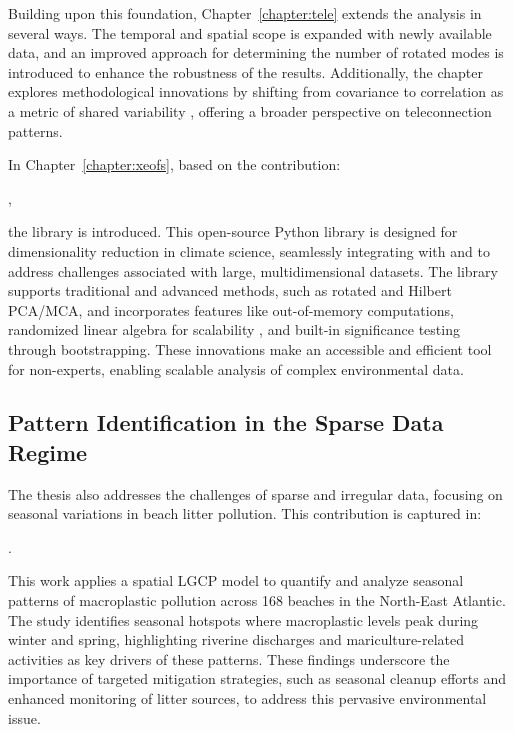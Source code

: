 Building upon this foundation, Chapter~\ref{chapter:tele} extends the analysis in several ways. The temporal and spatial scope is expanded with newly available data, and an improved approach for determining the number of rotated modes is introduced to enhance the robustness of the results. Additionally, the chapter explores methodological innovations by shifting from covariance to correlation as a metric of shared variability \cite{swenson_continuum_2015}, offering a broader perspective on teleconnection patterns.

In Chapter~\ref{chapter:xeofs}, based on the contribution:

    ,

the  library is introduced. This open-source Python library is designed for dimensionality reduction in climate science, seamlessly integrating with  \cite{hoyer_xarray_2017} and  \cite{dask_development_team_dask_2016} to address challenges associated with large, multidimensional datasets. The library supports traditional and advanced methods, such as rotated and Hilbert PCA/MCA, and incorporates features like out-of-memory computations, randomized linear algebra for scalability \cite{halko_finding_2011, erichson_randomized_2019}, and built-in significance testing through bootstrapping. These innovations make  an accessible and efficient tool for non-experts, enabling scalable analysis of complex environmental data.


\subsection*{Pattern Identification in the Sparse Data Regime}

The thesis also addresses the challenges of sparse and irregular data, focusing on seasonal variations in beach litter pollution. This contribution is captured in:

    .

This work applies a spatial LGCP model to quantify and analyze seasonal patterns of macroplastic pollution across 168 beaches in the North-East Atlantic. The study identifies seasonal hotspots where macroplastic levels peak during winter and spring, highlighting riverine discharges and mariculture-related activities as key drivers of these patterns. These findings underscore the importance of targeted mitigation strategies, such as seasonal cleanup efforts and enhanced monitoring of litter sources, to address this pervasive environmental issue.


